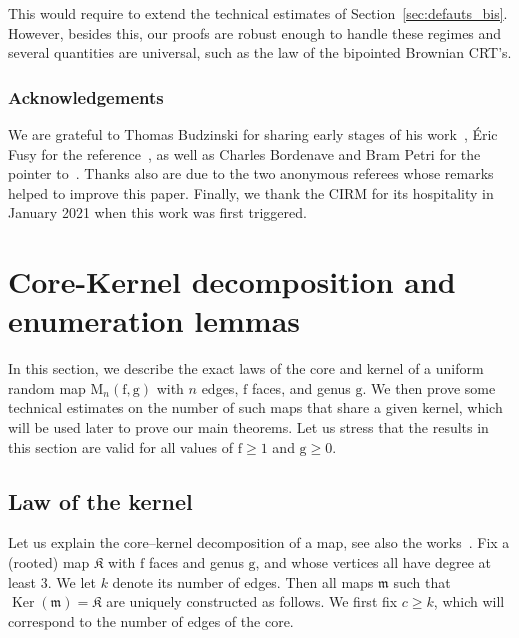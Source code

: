 \documentclass[10pt]{amsart}
\theoremstyle{plain}
\theoremstyle{definition}
\theoremstyle{remark}
\newcommand{\map}{\mathfrak{m}}
\newcommand{\Map}{\mathrm{M}}
\newcommand{\face}{\mathrm{f}}
\newcommand{\gen}{\mathrm{g}}
\DeclareMathOperator{\Ker}{Ker}
\newcommand{\kernel}{\mathfrak{K}}
\begin{document}
This would require to extend the technical estimates of Section~\ref{sec:defauts_bis}. However, besides this, our proofs are robust enough to handle these regimes and several quantities are universal, such as the law of the bipointed Brownian CRT's.

\subsubsection*{Acknowledgements}
We are grateful to Thomas Budzinski for sharing early stages of his work~\cite{Bud21}, \'Eric Fusy for the reference~\cite{BCR93}, as well as Charles Bordenave and Bram Petri for the pointer to~\cite[Th.\,2.19]{Wor99}.
Thanks also are due to the two anonymous referees whose remarks helped to improve this paper.
Finally, we thank the CIRM for its hospitality in January 2021 when this work was first triggered.

\section{Core-Kernel decomposition and enumeration lemmas}
\label{sec:enumeration}

In this section, we describe the exact laws of the core and kernel of a uniform random map $ \Map_n(\face,\gen)$ with $n$ edges, $\face$ faces, and genus $\gen$. We then prove some technical estimates on the number of such maps that share a given kernel, which will be used later to prove our main theorems.
Let us stress that the results in this section are valid for
all values of $\face \ge 1$ and $\gen \ge 0$.

\subsection{Law of the kernel}
\label{sec:decomposition}

Let us explain
the core--kernel decomposition of a map, see also the works~\cite{CMS09,Cha10}. Fix a (rooted) map $\kernel$ with $\face$ faces and genus $\gen$, and whose vertices all have degree at least $3$. We let $k$ denote its number of edges. Then all maps $\map$ such that $ \Ker(\map) = \kernel$ are uniquely constructed as follows. We first fix $c \geq k$, which will correspond to the number of edges of the core.
\end{document}
